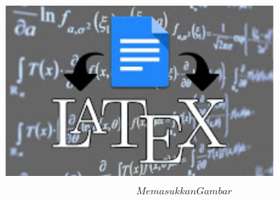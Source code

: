 \includegraphics[width=10cm,height=7cm]{gambar/dapi14.jpg}
\begin{equation}Memasukkan Gambar \end{equation}


